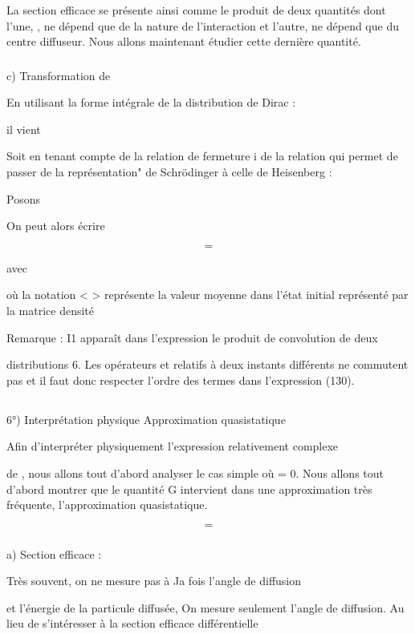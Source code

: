 {{{La section efficace se présente ainsi comme le produit de deux quantités dont
l'une, , ne dépend que de la nature de l'interaction et l'autre,
ne dépend que du centre diffuseur. Nous allons maintenant étudier cette dernière quantité.
\subsubsection{}%
c) Transformation de 

En utilisant la forme intégrale de la distribution de Dirac :

il vient

Soit en tenant compte de la relation de fermeture i de la
relation qui permet de passer de la représentation" de Schrödinger à celle de
Heisenberg :

Posons

On peut alors écrire

\[
\tag{129}=
\]

avec

où la notation < > représente la valeur moyenne dans l'état initial représenté
par la matrice densité

Remarque : I1 apparaît dans l'expression  le produit de convolution de deux

distributions 6. Les opérateurs  et  relatifs à deux instants différents
ne commutent pas et il faut donc respecter l'ordre des termes dans l'expression (130).

\subsection{}%
6°) Interprétation physique Approximation quasistatique

 

Afin d'interpréter physiquement l'expression relativement complexe

de , nous allons tout d'abord analyser le cas simple où  = 0. Nous allons
tout d'abord montrer que le quantité G  intervient dans une approximation
très fréquente, l'approximation quasistatique.

\[
\tag{131}=
\]

\subsubsection{}%
a) Section efficace :

Très souvent, on ne mesure pas à Ja fois l'angle de diffusion

et l'énergie de la particule diffusée, On mesure seulement l'angle de diffusion.
Au lieu de s'intéresser à la section efficace différentielle

}}}
